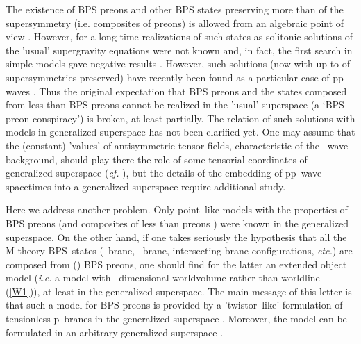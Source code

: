 \documentclass[a4paper,11pt]{article}
\begin{document}
The existence of BPS preons and  other BPS states preserving more than 
\coordHE{} of the supersymmetry (i.e. composites of  
\coordHE{} preons) 
is allowed from an algebraic point of view 
\cite{BL98,Hull99,GGHT00}. However, for a long time  realizations 
of such states as solitonic solutions of the 'usual' \coordHE{} supergravity 
equations were not known and, in fact, 
the first search in simple models gave negative results \cite{GGHT00}. 
However, 
such solutions (now with up to \coordHE{} of \coordHE{} supersymmetries 
preserved) have recently been found 
\cite{CLP02,GH02,BJM02} as a particular case of 
pp--waves \cite{PP}. Thus the original 
expectation that BPS preons and the states composed from 
less than \coordHE{} BPS preons cannot be realized in the 'usual' superspace  
(a `BPS preon conspiracy')  is  broken, at least partially.  
The relation of such solutions with models in generalized superspace 
has not been clarified yet. One may assume that  
the (constant) 'values' of antisymmetric tensor fields, characteristic
of the \coordHE{}--wave background, should play there the role of 
some tensorial coordinates of generalized superspace 
({\it cf.} \cite{JdA00}), but the details of the 
embedding of pp--wave spacetimes into a generalized superspace require 
additional study. 

Here we address another problem. 
Only point--like models 
with the properties of BPS preons \cite{BL98} (and composites of less than 
\coordHE{} preons \cite{BL98'}) were known in the  generalized superspace. 
On the other hand, if one takes seriously the hypothesis 
\cite{BPS01} that all the M-theory BPS--states (\coordHE{}--brane, 
\coordHE{}--brane, intersecting brane configurations, {\it etc.}) are composed 
from (\coordHE{}) BPS preons, 
one should find for the latter an extended object  
model ({\it i.e.} a model with \coordHE{}--dimensional worldvolume 
\coordHE{} rather than worldline \coordHE{} (\ref{W1})), at least in 
the generalized superspace. 
The main message of this letter is that such a model for 
\coordHE{} BPS preons is provided by a 'twistor--like' formulation of 
tensionless p--branes in the generalized superspace \coordHE{}. 
Moreover, the model can be formulated in an arbitrary generalized superspace 
 \coordHE{}. 
\end{document}
